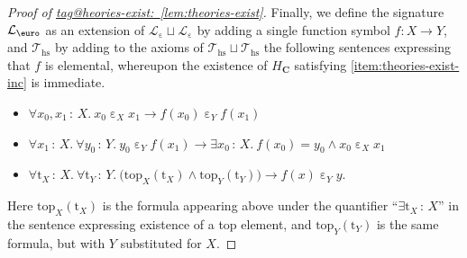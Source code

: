 \documentclass{amsart}
\makeatletter
\newcommand\bC{\mathbf{C}}
\newcommand\cL{\mathcal{L}}
\newcommand\cT{\mathcal{T}}
\newcommand\Ein{\mathrel{\text{\textup{\euro}}}}
\newcommand\ein{\mathrel{\varepsilon}}
\newcommand\hs{\mathrm{hs}}
\newcommand\pbig[1]{\big({#1}\big)}
\newcommand\rt{\mathrm{t}}
\newcommand\tolon{{\,:\,}}
\newcommand\topp{\mathrm{top}}
\newcommand\unein{{\ein}}
\newcommand\unEin{{\Ein}}
\newcommand\tagword[1]{\csname tag@#1\endcsname}
\def\label@tag#1:#2\@nil{#1}
\newcommand\labeltag[1]{\label@tag#1:\@nil}
\newcommand\jref[1]{%
  \texorpdfstring%
    {\hyperref[#1]{\tagword{\labeltag{#1}}~\ref*{#1}}}%
    {\tagword{\labeltag{#1}}~\ref*{#1}}%
}
\theoremstyle{definition}
\theoremstyle{remark}
\theoremstyle{plainwithref}
\makeatother
\begin{document}
\begin{proof}[Proof of \jref{lem:theories-exist}]
  Finally, we define the signature \( \cL_\unEin \) as an extension of \( \cL_\unein \sqcup \cL_\unein \) by adding a single function symbol \( f \colon X \to Y \), and \( \cT_\hs \) by adding to the axioms of \( \cT_{\hs} \sqcup \cT_{\hs} \) the following sentences expressing that \( f \) is elemental, whereupon the existence of \( H_\bC \) satisfying \ref{item:theories-exist-inc} is immediate.
  \begin{itemize}
  \item \( \forall x_0,x_1 \tolon X.\ x_0 \ein_X x_1 \to f(x_0) \ein_Y f(x_1) \)
  \item \( \forall x_1 \tolon X.\ \forall y_0 \tolon Y.\ y_0 \ein_Y f(x_1) \to \exists x_0 \tolon X.\ f(x_0) = y_0 \wedge x_0 \ein_X x_1 \)
  \item \( \forall \rt_X \tolon X.\ \forall \rt_Y \tolon Y.\ \pbig{\topp_X(\rt_X) \wedge \topp_Y(\rt_Y)} \to f(x) \ein_Y y \).
  \end{itemize}
  Here \( \topp_X(\rt_X) \) is the formula appearing above under the quantifier ``\( \exists \rt_X \tolon X \)'' in the sentence expressing existence of a top element, and \( \topp_Y(\rt_Y) \) is the same formula, but with \( Y \) substituted for \( X \).
\end{proof}
\end{document}
